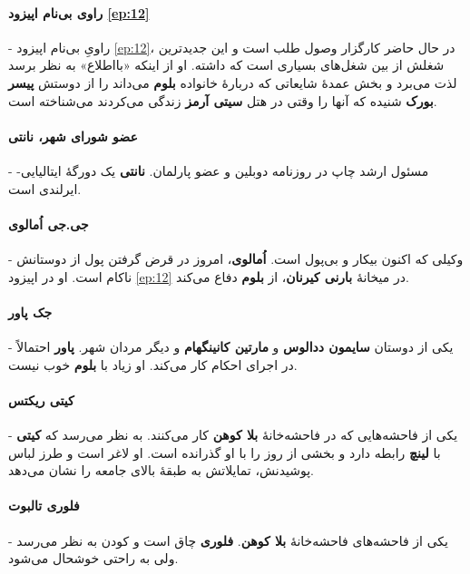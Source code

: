 \documentclass[12pt]{book}
\newcommand{\noun}[1]{{\textbf{#1}}}
\begin{document}
    \paragraph{\noun{راوی بی‌نام اپیزود \ref{ep:12}}} -
    راویِ بی‌نام اپیزود \ref{ep:12}، در حال حاضر کارگزار وصول طلب است و این جدیدترین شغلش از بین شغل‌های بسیاری است که داشته. او از اینکه «بااطلاع» به نظر برسد لذت می‌برد و بخش عمدهٔ شایعاتی که دربارهٔ خانواده \noun{بلوم} می‌داند را از دوستش \noun{پیسر بورک} شنیده که آنها را وقتی در هتل \noun{سیتی آرمز} زندگی می‌کردند می‌شناخته است.
    \paragraph{\noun{عضو شورای شهر، نانتی}\protect{}} -
    مسئول ارشد چاپ در روزنامه دوبلین و عضو پارلمان. \noun{نانتی} یک دورگهٔ ایتالیایی-ایرلندی است.
    \paragraph{\noun{جی.جی اُمالوی}\protect{}} -
    وکیلی که اکنون بیکار و بی‌پول است. \noun{اُمالوی}، امروز در قرض گرفتن پول از دوستانش ناکام است. او در اپیزود \ref{ep:12} در میخانهٔ \noun{بارنی کیرنان}، از \noun{بلوم} دفاع می‌کند.
    \paragraph{\noun{جک پاور}\protect{}} -
    یکی از دوستان \noun{سایمون ددالوس‬} و \noun{مارتین کانینگهام}  و دیگر مردان شهر. \noun{پاور} احتمالاً در اجرای احکام کار می‌کند. او زیاد با \noun{بلوم} خوب نیست.
    \paragraph{\noun{کیتی ریکتس}\protect{}} -
    یکی از فاحشه‌هایی که در فاحشه‌خانهٔ \noun{بلا کوهن} کار می‌کنند. به نظر می‌رسد که \noun{کیتی} با \noun{لینچ} رابطه دارد و بخشی از روز را با او گذرانده است. او لاغر است و طرز لباس پوشیدنش، تمایلاتش به طبقهٔ بالای جامعه را نشان می‌دهد.
    \paragraph{\noun{فلوری تالبوت}\protect{}} -
    یکی از فاحشه‌های فاحشه‌خانهٔ \noun{بلا کوهن}. \noun{فلوری} چاق است و کودن به نظر می‌رسد ولی به راحتی خوشحال می‌شود.
\end{document}

